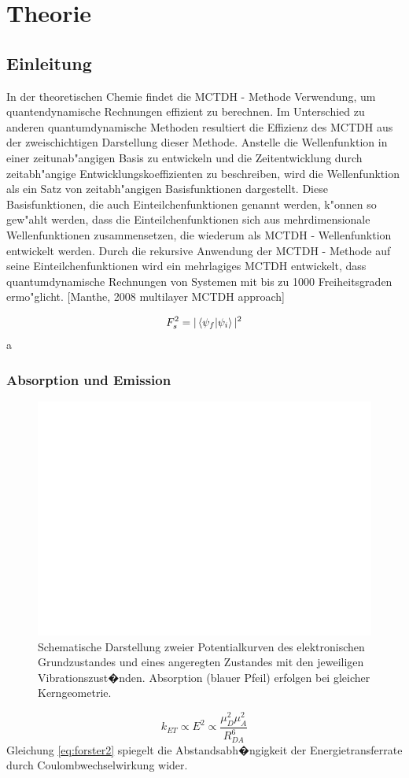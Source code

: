 \chapter{Theorie}

\section{Einleitung}

In der theoretischen Chemie findet die MCTDH - Methode Verwendung, um quantendynamische Rechnungen effizient zu berechnen.
Im Unterschied zu anderen quantumdynamische Methoden resultiert die Effizienz des MCTDH aus der zweischichtigen Darstellung dieser Methode.
Anstelle die Wellenfunktion in einer zeitunab"angigen Basis zu entwickeln und die Zeitentwicklung durch zeitabh"angige Entwicklungskoeffizienten zu beschreiben,
wird die Wellenfunktion als ein Satz von zeitabh"angigen Basisfunktionen dargestellt.
Diese Basisfunktionen, die auch Einteilchenfunktionen genannt werden, k"onnen so gew"ahlt werden, dass die Einteilchenfunktionen sich aus mehrdimensionale
Wellenfunktionen zusammensetzen, die wiederum als MCTDH - Wellenfunktion entwickelt werden.
Durch die rekursive Anwendung der MCTDH - Methode auf seine Einteilchenfunktionen wird ein mehrlagiges MCTDH entwickelt, dass quantumdynamische Rechnungen
von Systemen mit bis zu 1000 Freiheitsgraden ermo"glicht. [Manthe, 2008 multilayer MCTDH approach]



 \begin{equation}
 F_{s}^{2}=|\Braket{\psi_{f}}{\psi_{i}}|^{2}
 \label{eq:franck1}
 \end{equation}
a
 \subsection{Absorption und Emission}
 \begin{figure}
\centering
\includegraphics[width=0.7\linewidth]{figures/Franck}
\caption{Schematische Darstellung zweier Potentialkurven des elektronischen Grundzustandes und eines angeregten Zustandes mit den jeweiligen Vibrationszust�nden. Absorption (blauer Pfeil) erfolgen bei gleicher Kerngeometrie.}
\label{fig:Franck}
\end{figure}
 \begin{equation}
k_{ET} \propto E^{2}\propto \frac{\mu_{D}^{2}\mu_{A}^{2}}{R_{DA}^{6}}
\label{eq:forster2}
 \end{equation}
  Gleichung \ref{eq:forster2} spiegelt die Abstandsabh�ngigkeit der Energietransferrate durch Coulombwechselwirkung wider.\cite{turro:1991}
